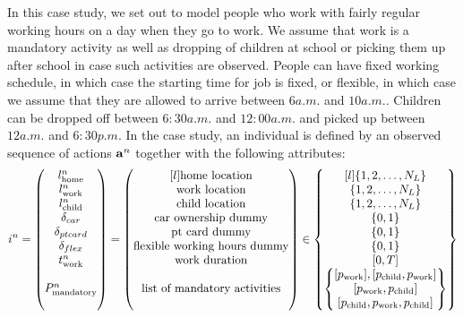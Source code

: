 In this case study, we set out to model people who work with fairly regular working hours on a day when they go to work. We assume that work is a mandatory activity as well as dropping of children at school or picking them up after school in case such activities are observed. People can have fixed working schedule, in which case the starting time for job is fixed, or flexible, in which case we assume that they are allowed to arrive between $6\unit{a.m.}$ and $10\unit{a.m.}$.
Children can be dropped off between $6:30\unit{a.m.}$ and $12:00\unit{a.m.}$ and picked up between $12\unit{a.m.}$ and $6:30\unit{p.m.}$
In the case study, an individual is defined by an observed sequence of actions ${\bf a}^n$ together with the following attributes:
\begin{equation}
i^n = 
\begin{pmatrix}
l^n_\text{home} \\
l^n_\text{work} \\
l^n_\text{child} \\
\dummy{car} \\
\dummy{pt card} \\
\dummy{flex} \\
t^n_\text{work}\\
\\
P^n_{\text{mandatory}}
\\
\text {}
\end{pmatrix} = 
\begin{pmatrix*}[l]
\text{home location} \\
\text{work location} \\
\text{child location} \\
\text{car ownership dummy} \\
\text{pt card dummy} \\
\text{flexible working hours dummy} \\
\text{work duration} \\
\\
\text{list of mandatory activities}
\\
\text {}
\end{pmatrix*}
\in
\begin{Bmatrix*}[l]
\{1,2,\dots, N_L\} \\
\{1,2,\dots, N_L\} \\
\{1,2,\dots, N_L\} \\
\{0,1\} \\
\{0,1\} \\
\{0,1\} \\
[0,T] \\
\begin{Bmatrix*} [\p{work}] ,[\p{child},\p{work}] \\  
[\p{work},\p{child}] 
\\ [\p{child},\p{work},\p{child}]\end{Bmatrix*}
\end{Bmatrix*}
\end{equation}
